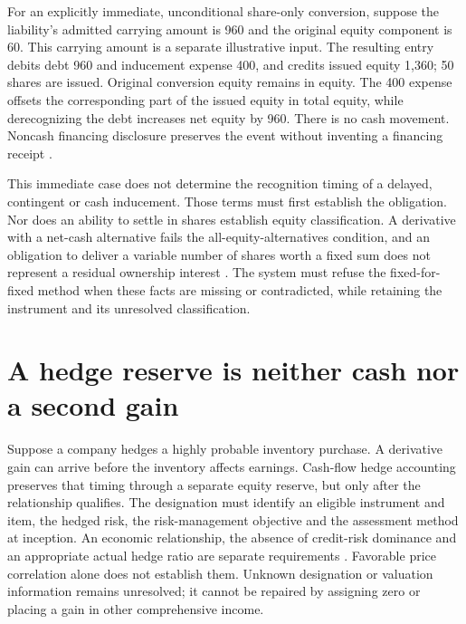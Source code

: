 For an explicitly immediate, unconditional share-only conversion, suppose the
liability's admitted carrying amount is 960 and the original equity component
is 60. This carrying amount is a separate illustrative input. The resulting
entry debits debt 960 and inducement expense 400, and credits issued equity
1,360; 50 shares are issued. Original conversion equity remains in equity.
The 400 expense offsets the corresponding part of the issued equity in total
equity, while derecognizing the debt increases net equity by 960. There is no
cash movement. Noncash financing disclosure preserves the event without
inventing a financing receipt \citep[43--44]{aasb107dated}.

This immediate case does not determine the recognition timing of a delayed,
contingent or cash inducement. Those terms must first establish the obligation.
Nor does an ability to settle in shares establish equity classification.
A derivative with a net-cash alternative fails the all-equity-alternatives
condition, and an obligation to deliver a variable number of shares worth a
fixed sum does not represent a residual ownership interest
\citep[21 and 26--27]{aasb132}. The system must refuse the fixed-for-fixed
method when these facts are missing or contradicted, while retaining the
instrument and its unresolved classification.

\section{A hedge reserve is neither cash nor a second gain}
\label{sec:hedge-lifecycle}

Suppose a company hedges a highly probable inventory purchase. A derivative
gain can arrive before the inventory affects earnings. Cash-flow hedge
accounting preserves that timing through a separate equity reserve, but only
after the relationship qualifies. The designation must identify an eligible
instrument and item, the hedged risk, the risk-management objective and the
assessment method at inception. An economic relationship, the absence of
credit-risk dominance and an appropriate actual hedge ratio are separate
requirements \citep[6.2--6.4 and B6.4.1--19]{aasb9dated}. Favorable price
correlation alone does not establish them. Unknown designation or valuation
information remains unresolved; it cannot be repaired by assigning zero or
placing a gain in other comprehensive income.

